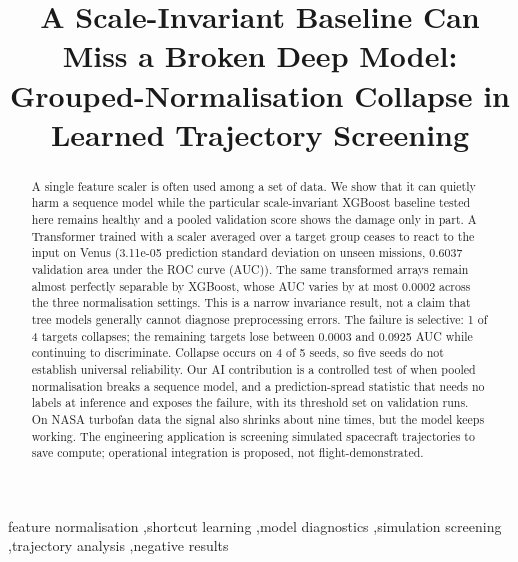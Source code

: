 \documentclass[preprint,12pt,authoryear,doubleblind]{elsarticle}
\begin{document}
\begin{frontmatter}

\title{A Scale-Invariant Baseline Can Miss a Broken Deep Model: Grouped-Normalisation Collapse in Learned Trajectory Screening}


\begin{abstract}
A single feature scaler is often used among a set of data. We show that it can quietly harm a sequence model while the particular scale-invariant XGBoost baseline tested here remains healthy and a pooled validation score shows the damage only in part. A Transformer trained with a scaler averaged over a target group ceases to react to the input on Venus (3.11e-05 prediction standard deviation on unseen missions, 0.6037 validation area under the ROC curve (AUC)). The same transformed arrays remain almost perfectly separable by XGBoost, whose AUC varies by at most 0.0002 across the three normalisation settings. This is a narrow invariance result, not a claim that tree models generally cannot diagnose preprocessing errors. The failure is selective: 1 of 4 targets collapses; the remaining targets lose between 0.0003 and 0.0925 AUC while continuing to discriminate. Collapse occurs on 4 of 5 seeds, so five seeds do not establish universal reliability. Our AI contribution is a controlled test of when pooled normalisation breaks a sequence model, and a prediction-spread statistic that needs no labels at inference and exposes the failure, with its threshold set on validation runs. On NASA turbofan data the signal also shrinks about nine times, but the model keeps working. The engineering application is screening simulated spacecraft trajectories to save compute; operational integration is proposed, not flight-demonstrated.
\end{abstract}


\begin{keyword}
feature normalisation \sep shortcut learning \sep model diagnostics \sep simulation screening \sep trajectory analysis \sep negative results
\end{keyword}

\end{frontmatter}
\end{document}
